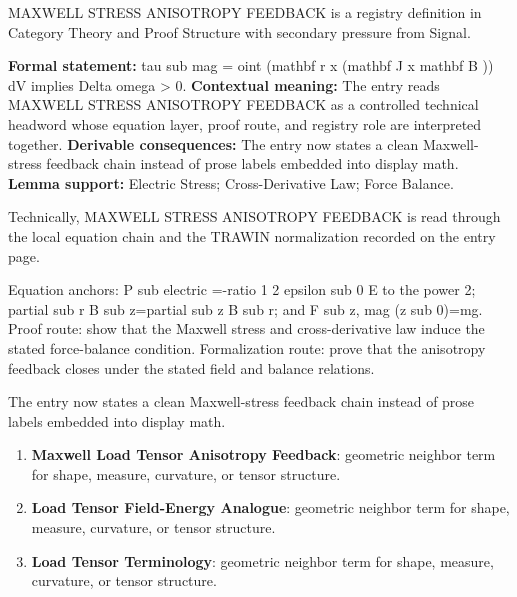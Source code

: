 
\begingroup\small
{}
MAXWELL STRESS ANISOTROPY FEEDBACK is a registry definition in Category Theory and Proof Structure with secondary pressure from Signal.

\begingroup\footnotesize\setlength{\emergencystretch}{3em}\sloppy
\textbf{Formal statement:} tau sub mag = oint (mathbf r x (mathbf J x mathbf B )) dV implies Delta omega > 0. \textbf{Contextual meaning:} The entry reads MAXWELL STRESS ANISOTROPY FEEDBACK as a controlled technical headword whose equation layer, proof route, and registry role are interpreted together. \textbf{Derivable consequences:} The entry now states a clean Maxwell-stress feedback chain instead of prose labels embedded into display math. \textbf{Lemma support:} Electric Stress; Cross-Derivative Law; Force Balance.\par
\endgroup

Technically, MAXWELL STRESS ANISOTROPY FEEDBACK is read through the local equation chain and the TRAWIN normalization recorded on the entry page.

Equation anchors: P sub electric =-ratio 1 2 epsilon sub 0 E to the power 2; partial sub r B sub z=partial sub z B sub r; and F sub z, mag (z sub 0)=mg. Proof route: show that the Maxwell stress and cross-derivative law induce the stated force-balance condition. Formalization route: prove that the anisotropy feedback closes under the stated field and balance relations.

The entry now states a clean Maxwell-stress feedback chain instead of prose labels embedded into display math.
\endgroup

\begin{enumerate}[leftmargin=1.6em,itemsep=6pt,topsep=4pt]
\item \textbf{Maxwell Load Tensor Anisotropy Feedback}: geometric neighbor term for shape, measure, curvature, or tensor structure.
\item \textbf{Load Tensor Field-Energy Analogue}: geometric neighbor term for shape, measure, curvature, or tensor structure.
\item \textbf{Load Tensor Terminology}: geometric neighbor term for shape, measure, curvature, or tensor structure.
\end{enumerate}

